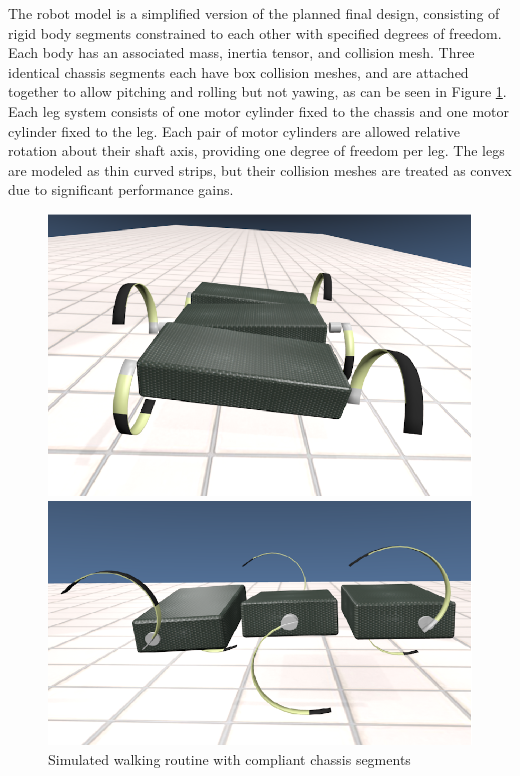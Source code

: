 \documentclass[11pt]{article}
\begin{document}
The robot model is a simplified version of the planned final design, consisting of rigid body segments constrained to each other with specified degrees of freedom. Each body has an associated mass, inertia tensor, and collision mesh. Three identical chassis segments each have box collision meshes, and are attached together to allow pitching and rolling but not yawing, as can be seen in Figure \ref{fig:simulationwalking}. Each leg system consists of one motor cylinder fixed to the chassis and one motor cylinder fixed to the leg. Each pair of motor cylinders are allowed relative rotation about their shaft axis, providing one degree of freedom per leg. The legs are modeled as thin curved strips, but their collision meshes are treated as convex due to significant performance gains. 

\begin{figure}[t]
\begin{minipage}[b]{0.45\linewidth}
\centering
\includegraphics[width=\textwidth]{report_gr4.eps}
\end{minipage}
\hspace{0.5cm}
\begin{minipage}[b]{0.45\linewidth}
\centering
\includegraphics[width=\textwidth]{report_gr5.eps}
\end{minipage}
\caption{Simulated walking routine with compliant chassis segments}
\label{fig:simulationwalking}
\end{figure}
\end{document}
